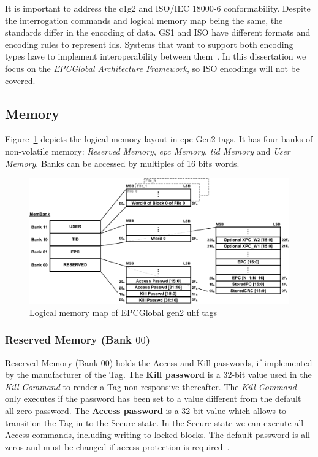It is important to address the \ac{c1g2} and ISO/IEC 18000-6 conformability. Despite the interrogation commands and logical memory map being the same, the standards differ in the encoding of data. 
GS1 and ISO have different formats and encoding rules to represent \acp{id}.
Systems that want to support both encoding types have to implement interoperability between them~\cite{mizutaniMulticodePortableRFID2016a}.
In this dissertation we focus on the \emph{EPCGlobal Architecture Framework}, so ISO encodings will not be covered.

\subsection{Memory}

Figure~\ref{fig:logicalmemorymap} depicts the logical memory layout in \ac{epc} Gen2 tags. It has four banks of non-volatile memory: \emph{Reserved Memory}, \emph{\ac{epc} Memory}, \emph{\ac{tid} Memory} and \emph{User Memory}. Banks can be accessed by multiples of 16 bits words.

\begin{figure}[!ht]
    \centering
    \includegraphics[width=\textwidth]{./figs/02-state-of-the-art/logicmemorymap.pdf}
    \caption{Logical memory map of EPCGlobal \ac{gen2} \ac{uhf} tags~\cite{Gs1epcgen2v2uhfairinterfaceI2120180904}} 
    \label{fig:logicalmemorymap}
\end{figure}

\subsubsection{Reserved Memory (Bank $00$)}

Reserved Memory (Bank $00$) holds the Access and Kill passwords, if implemented by the manufacturer of the Tag. 
The \textbf{Kill password} is a 32-bit value used in the \textit{Kill Command} to render a Tag non-responsive thereafter. The \textit{Kill Command} only executes if the password has been set to a value different from the default all-zero password. 
The \textbf{Access password} is a 32-bit value which allows to transition the Tag in to the Secure state. In the Secure state we can execute all Access commands, including writing to locked blocks. The default password is all zeros and must be changed if access protection is required~\cite{RFIDEPCGen2, Gs1epcgen2v2uhfairinterfaceI2120180904}.

